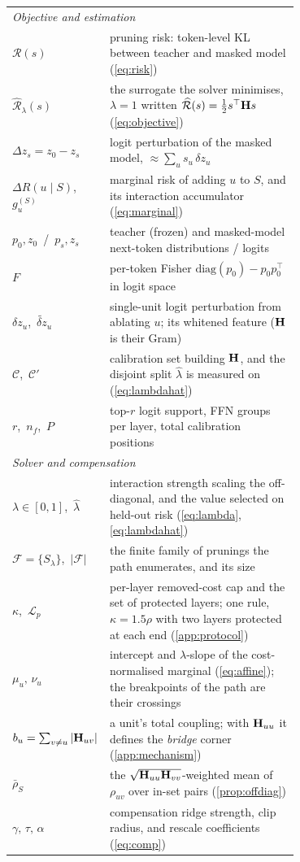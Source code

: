 \begin{table}[htbp]
\begin{tabular}{@{}l@{\quad}p{0.70\linewidth}@{}}
\midrule
\multicolumn{2}{l}{\emph{Objective and estimation}}\\
$\mathcal R(s)$ & pruning risk: token-level KL between teacher and masked model (\cref{eq:risk})\\
$\widehat{\mathcal R}_\lambda(s)$ & the surrogate the solver minimises, $\lambda{=}1$ written
$\widehat{\mathcal R}(s)=\tfrac12 s^\top\mathbf{H} s$ (\cref{eq:objective})\\
$\Delta z_s=z_0-z_s$ & logit perturbation of the masked model, $\approx\sum_u s_u\,\delta z_u$\\
$\Delta R(u\mid S)$,\, $g_u^{(S)}$ & marginal risk of adding $u$ to $S$, and its interaction accumulator
(\cref{eq:marginal})\\
$p_0,z_0$\, / \,$p_s,z_s$ & teacher (frozen) and masked-model next-token distributions / logits\\
$F$ & per-token Fisher $\mathrm{diag}(p_0)-p_0p_0^{\!\top}$ in logit space\\
$\delta z_u$,\, $\widetilde{\delta z}_u$ & single-unit logit perturbation from ablating $u$; its whitened feature ($\mathbf{H}$ is their Gram)\\
$\mathcal C$,\, $\mathcal C'$ & calibration set building $\mathbf{H}$, and the disjoint split $\hat\lambda$ is
measured on (\cref{eq:lambdahat})\\
$r$,\, $n_f$,\, $P$ & top-$r$ logit support, FFN groups per layer, total calibration positions\\
\midrule
\multicolumn{2}{l}{\emph{Solver and compensation}}\\
$\lambda\in[0,1]$,\, $\hat\lambda$ & interaction strength scaling the off-diagonal, and the value
selected on held-out risk (\cref{eq:lambda}, \cref{eq:lambdahat})\\
$\mathcal F=\{S_\lambda\}$,\, $|\mathcal F|$ & the finite family of prunings the path enumerates, and its
size\\
$\kappa$,\, $\mathcal L_p$ & per-layer removed-cost cap and the set of protected layers; one rule,
$\kappa{=}1.5\rho$ with two layers protected at each end (\cref{app:protocol})\\
$\mu_u,\, \nu_u$ & intercept and $\lambda$-slope of the cost-normalised marginal (\cref{eq:affine});
the breakpoints of the path are their crossings\\
$b_u=\sum_{v\ne u}|\mathbf{H}_{uv}|$ & a unit's total coupling; with $\mathbf{H}_{uu}$ it defines the
\emph{bridge} corner (\cref{app:mechanism})\\
$\bar\rho_S$ & the $\sqrt{\mathbf{H}_{uu}\mathbf{H}_{vv}}$-weighted mean of $\rho_{uv}$ over in-set pairs
(\cref{prop:offdiag})\\
$\gamma,\, \tau,\, \alpha$ & compensation ridge strength, clip radius, and rescale coefficients (\cref{eq:comp})\\
\bottomrule
\end{tabular}
\end{table}
